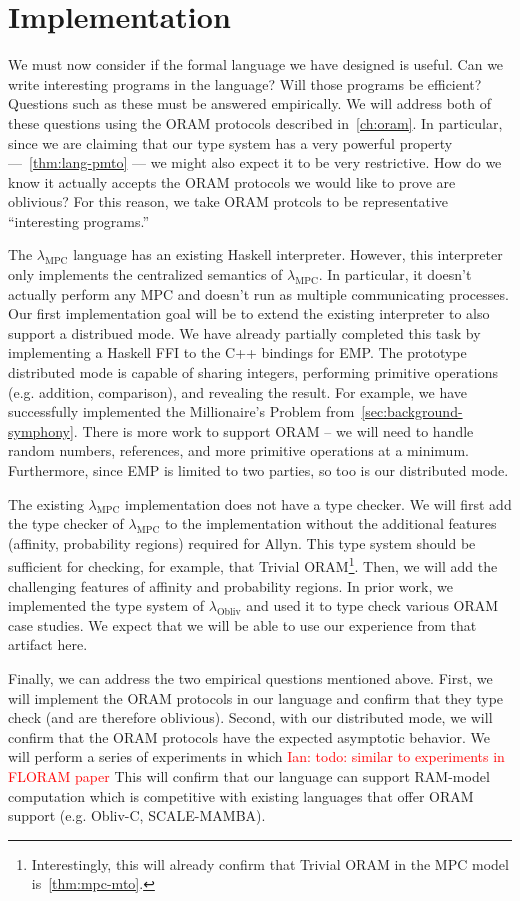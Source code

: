 \documentclass{report}
\newcommand{\lang}{Allyn\xspace}
\newcommand{\mpc}{\ensuremath{\lambda_{\mathrm{MPC}}}\xspace}
\newcommand{\obliv}{\ensuremath{\lambda_{\mathrm{Obliv}}}\xspace}
\newcommand{\ins}[1]{\textcolor{red}{Ian: #1}}
\begin{document}
\section{Implementation}

We must now consider if the formal language we have designed is useful. Can we write interesting programs in the language?
Will those programs be efficient? Questions such as these must be answered empirically. We will address both of these questions
using the ORAM protocols described in~\cref{ch:oram}. In particular, since we are claiming that our type system has a very powerful
property ---~\cref{thm:lang-pmto} --- we might also expect it to be very restrictive. How do we know it actually accepts the ORAM
protocols we would like to prove are oblivious? For this reason, we take ORAM protcols to be representative ``interesting programs.''

The \mpc language has an existing Haskell interpreter. However, this interpreter only implements the centralized semantics of \mpc.
In particular, it doesn't actually perform any MPC and doesn't run as multiple communicating processes. Our first implementation
goal will be to extend the existing interpreter to also support a distribued mode. We have already partially completed this task
by implementing a Haskell FFI to the C++ bindings for EMP. The prototype distributed mode is capable of sharing integers, performing
primitive operations (e.g. addition, comparison), and revealing the result. For example, we have successfully implemented the Millionaire's Problem
from~\ref{sec:background-symphony}. There is more work to support ORAM -- we will need to handle random numbers, references, and
more primitive operations at a minimum. Furthermore, since EMP is limited to two parties, so too is our distributed mode.

The existing \mpc implementation does not have a type checker. We will first add the type checker of \mpc to the implementation without
the additional features (affinity, probability regions) required for \lang. This type system should be sufficient for checking, for example,
that Trivial ORAM\footnote{Interestingly, this will already confirm that Trivial ORAM in the MPC model is~\ref{thm:mpc-mto}.}. Then, we will
add the challenging features of affinity and probability regions. In prior work, we implemented the type system of \obliv and used it to
type check various ORAM case studies. We expect that we will be able to use our experience from that artifact here.

Finally, we can address the two empirical questions mentioned above. First, we will implement the ORAM protocols in our language and confirm
that they type check (and are therefore oblivious). Second, with our distributed mode, we will confirm that the ORAM protocols have the
expected asymptotic behavior. We will perform a series of experiments in which \ins{todo: similar to experiments in FLORAM paper}
This will confirm that our language can support RAM-model computation which is competitive with existing languages that offer ORAM support
(e.g. Obliv-C, SCALE-MAMBA).
\end{document}
